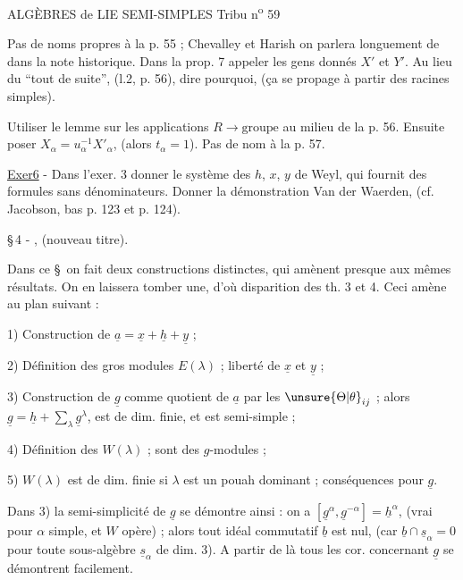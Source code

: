 ALGÈBRES de LIE SEMI-SIMPLES \hfill Tribu n\textsuperscript{o} 59

Pas de noms propres à la p. 55 ; Chevalley et Harish on parlera longuement de dans la note historique. Dans la prop. 7 appeler les gens donnés $X'$ et $Y'$. Au lieu du ``tout de suite'', (l.2, p. 56), dire pourquoi, (ça se propage à partir des racines simples).

Utiliser le lemme sur les applications $R\longrightarrow\text{groupe}$ au milieu de la p. 56. Ensuite poser $X_\alpha=u_\alpha^{-1}X'_\alpha$, (alors $t_\alpha=1$). Pas de nom à la p. 57.

\uline{Exer6} - Dans l'exer. 3 donner le système des $h$, $x$, $y$ de Weyl, qui fournit des formules sans dénominateurs. Donner la démonstration Van der Waerden, (cf. Jacobson, bas p. 123 et p. 124).

\S\,4 - , (nouveau titre).

Dans ce \S\ on fait deux constructions distinctes, qui amènent presque aux mêmes résultats. On en laissera tomber une, d'où disparition des th. 3 et 4. Ceci amène au plan suivant :

1) Construction de $\underline{a}=\underline{x}+\underline{h}+\underline{y}$ ;

2) Définition des gros modules $E(\lambda)$ ; liberté de $\underline{x}$ et $\underline{y}$ ;

3) Construction de $\underline{g}$ comme quotient de $\underline{a}$ par les $\unsure{\Theta|\theta}_{ij}$ ; alors $\underline{g}=\underline{h}+\sum_{\lambda}\underline{g}^{\lambda}$, est de dim. finie, et est semi-simple ;

4) Définition des $W(\lambda)$ ; sont des $g$-modules ;

5) $W(\lambda)$ est de dim. finie si $\lambda$ est un pouah dominant ; conséquences pour $\underline{g}$.

Dans 3) la semi-simplicité de $\underline{g}$ se démontre ainsi : on a $[\underline{g}^{\alpha},\underline{g}^{-\alpha}]=\underline{h}^{\alpha}$, (vrai pour $\alpha$ simple, et $W$ opère) ; alors tout idéal commutatif $\underline{b}$ est nul, (car $\underline{b}\cap\underline{s}_\alpha=0$ pour toute sous-algèbre $\underline{s}_\alpha$ de dim. 3). A partir de là tous les cor. concernant $\underline{g}$ se démontrent facilement.
